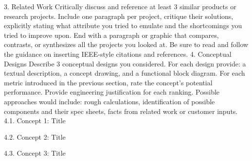     3. Related Work
Critically discuss and reference at least 3 similar products or research projects.  Include one paragraph per project, critique their solutions, explicitly stating what attribute you tried to emulate and the shortcomings you tried to improve upon.  
End with a paragraph or graphic that compares, contrasts, or synthesizes all the projects you looked at.  
Be sure to read and follow the guidance on inserting IEEE-style citations and references. 
    4. Conceptual Designs
Describe 3 conceptual designs you considered.    For each design provide: a textual description, a concept drawing, and a functional block diagram.  For each metric introduced in the previous section, rate the concept’s potential performance.   Provide engineering justification for each ranking.   Possible approaches would include: rough calculations, identification of possible components and their spec sheets, facts from related work or customer inputs. 
        4.1. Concept 1:  Title

        4.2. Concept 2:  Title

        4.3. Concept 3:  Title

